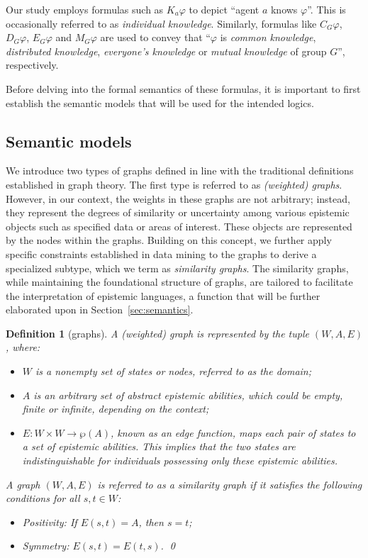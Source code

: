 \documentclass{article}
\newtheorem{definition}[theorem]{Definition}%
\newcommand{\ab}{\ensuremath{A}\xspace}
\renewcommand{\phi}{\varphi}
\begin{document}
Our study employs formulas such as $K_a \phi$ to depict ``agent $a$ knows $\phi$''. This is occasionally referred to as \emph{individual knowledge}. Similarly, formulas like $C_G\phi$, $D_G\phi$, $E_G\phi$ and $M_G\phi$ are used to convey that ``$\phi$ is \emph{common knowledge}, \emph{distributed knowledge}, \emph{everyone's knowledge} or \emph{mutual knowledge} of group $G$'', respectively.

Before delving into the formal semantics of these formulas, it is important to first establish the semantic models that will be used for the intended logics.

\subsection{Semantic models}\label{sec:models}

We introduce two types of graphs defined in line with the traditional definitions established in graph theory. The first type is referred to as \emph{(weighted) graphs}. However, in our context, the weights in these graphs are not arbitrary; instead, they represent the degrees of similarity or uncertainty among various epistemic objects such as specified data or areas of interest. These objects are represented by the nodes within the graphs. Building on this concept, we further apply specific constraints established in data mining to the graphs to derive a specialized subtype, which we term as \emph{similarity graphs}. The similarity graphs, while maintaining the foundational structure of graphs, are tailored to facilitate the interpretation of epistemic languages, a function that will be further elaborated upon in Section~\ref{sec:semantics}.

\begin{definition}[graphs]\label{def:graphs}
A \emph{(weighted) graph} is represented by the tuple $(W,\ab,E)$, where:
\begin{itemize}
\item $W$ is a nonempty set of states or nodes, referred to as the \emph{domain};
\item \ab is an arbitrary set of abstract epistemic abilities, which could be empty, finite or infinite, depending on the context;
\item $E : W \times W \to \wp(\ab)$, known as an \emph{edge function}, maps each pair of states to a set of epistemic abilities. This implies that the two states are indistinguishable for individuals possessing only these epistemic abilities.
\end{itemize}
A graph $(W,\ab,E)$ is referred to as a \emph{similarity graph} if it satisfies the following conditions for all $s,t \in W$:
\begin{itemize}
\item Positivity: If $E(s,t) = \ab$, then $s = t$;
\item Symmetry: $E(s,t) = E(t,s)$.
\qed
\end{itemize}
\end{definition}
\end{document}
